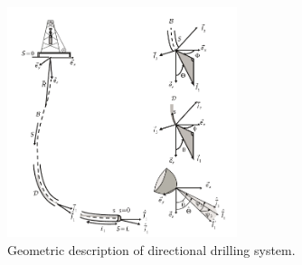 \begin{figure}[ht]\centering
	\includegraphics[width=0.6\textwidth]{img/geodesc.pdf}
	\caption{\label{fig:geoPD}Geometric description of directional drilling system.}
\end{figure}

